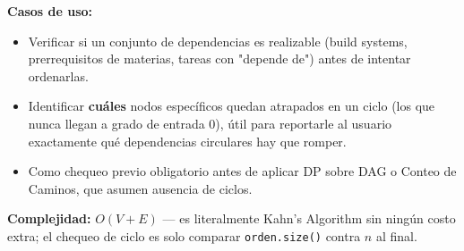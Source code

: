 \documentclass[10pt,a4paper,twocolumn]{article}
\begin{document}
\textbf{Casos de uso:}

\begin{itemize}
	\item Verificar si un conjunto de dependencias es realizable
	(build systems, prerrequisitos de materias, tareas con
	"depende de") antes de intentar ordenarlas.
	\item Identificar \textbf{cuáles} nodos específicos quedan
	atrapados en un ciclo (los que nunca llegan a grado de entrada 0),
	útil para reportarle al usuario exactamente qué dependencias
	circulares hay que romper.
	\item Como chequeo previo obligatorio antes de aplicar DP sobre
	DAG o Conteo de Caminos, que asumen ausencia de ciclos.
\end{itemize}

\textbf{Complejidad:} $O(V + E)$ — es literalmente Kahn's Algorithm
sin ningún costo extra; el chequeo de ciclo es solo comparar
\texttt{orden.size()} contra $n$ al final.
\end{document}
